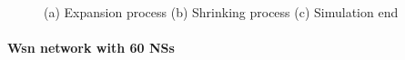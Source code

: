 \begin{figure}[H]
    \centering
    \caption{(a) Expansion process (b) Shrinking process (c) Simulation end}
    \label{fig:foobar}
\end{figure}

\paragraph{Wsn network with 60 NSs}

